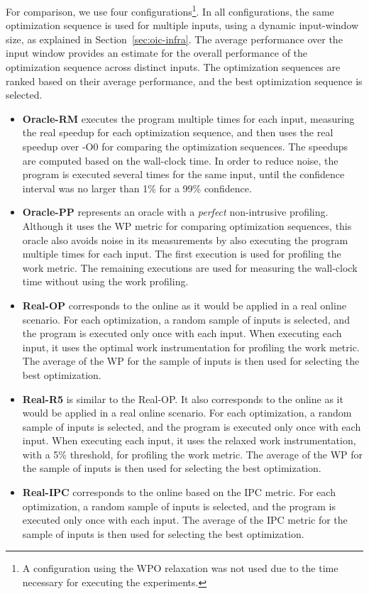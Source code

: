 For comparison, we use four configurations\footnote{A configuration using the WPO relaxation was not used due to the time necessary for executing the experiments.}.
In all configurations, the same optimization sequence is used for multiple inputs, using a dynamic input-window size, as explained in Section~\ref{sec:oic-infra}.
The average performance over the input window provides an estimate for the overall performance of the optimization sequence across distinct inputs.
The optimization sequences are ranked based on their average performance, and the best optimization sequence is selected.
\begin{itemize}
\item \textbf{Oracle-RM} executes the program multiple times for each input, measuring the real speedup for each optimization sequence, and then uses the real speedup over {\flagstype -O0} for comparing the optimization sequences.
  The speedups are computed based on the wall-clock time.
  In order to reduce noise, the program is executed several times for the same input, until the confidence interval was no larger than 1\% for a 99\% confidence.
\item \textbf{Oracle-PP} represents an oracle with a \textit{perfect} non-intrusive profiling.
  Although it uses the WP metric for comparing optimization sequences, this oracle also avoids noise in its measurements by also executing the program multiple times for each input.
  The first execution is used for profiling the work metric.
  The remaining executions are used for measuring the wall-clock time without using the work profiling.
\item \textbf{Real-OP} corresponds to the online {\itercomp} as it would be applied in a real online scenario.
  For each optimization, a random sample of inputs is selected, and the program is executed only once with each input.
  When executing each input, it uses the optimal work instrumentation for profiling the work metric.
  The average of the WP for the sample of inputs is then used for selecting the best optimization.
\item \textbf{Real-R5} is similar to the {Real-OP}.
  It also corresponds to the online {\itercomp} as it would be applied in a real online scenario.
  For each optimization, a random sample of inputs is selected, and the program is executed only once with each input.
  When executing each input, it uses the relaxed work instrumentation, with a 5\% threshold, for profiling the work metric.
  The average of the WP for the sample of inputs is then used for selecting the best optimization.
\item \textbf{Real-IPC} corresponds to the online {\itercomp} based on the IPC metric.
  For each optimization, a random sample of inputs is selected, and the program is executed only once with each input.
  The average of the IPC metric for the sample of inputs is then used for selecting the best optimization.
\end{itemize}
